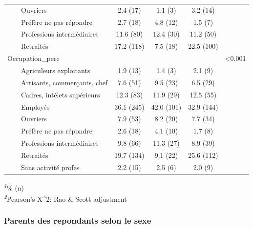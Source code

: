 \documentclass[
]{article}
\begin{document}
\begin{table}[!t]
\begin{tabular*}{\linewidth}{@{\extracolsep{\fill}}lcccc}
    Ouvriers & 2.4 (17) & 1.1 (3) & 3.2 (14) &  \\ 
    Préfère ne pas répondre & 2.7 (18) & 4.8 (12) & 1.5 (7) &  \\ 
    Professions intermédiaires & 11.6 (80) & 12.4 (30) & 11.2 (50) &  \\ 
    Retraités & 17.2 (118) & 7.5 (18) & 22.5 (100) &  \\ 
Occupation\_pere &  &  &  & <0.001 \\ 
    Agriculeurs exploitants & 1.9 (13) & 1.4 (3) & 2.1 (9) &  \\ 
    Artisants, commerçants, chef & 7.6 (51) & 9.5 (23) & 6.5 (29) &  \\ 
    Cadres, intélets supérieurs & 12.3 (83) & 11.9 (29) & 12.5 (55) &  \\ 
    Employés & 36.1 (245) & 42.0 (101) & 32.9 (144) &  \\ 
    Ouvriers & 7.9 (53) & 8.2 (20) & 7.7 (34) &  \\ 
    Préfère ne pas répondre & 2.6 (18) & 4.1 (10) & 1.7 (8) &  \\ 
    Professions intermédiaires & 9.8 (66) & 11.3 (27) & 8.9 (39) &  \\ 
    Retraités & 19.7 (134) & 9.1 (22) & 25.6 (112) &  \\ 
    Sans activité profes & 2.2 (15) & 2.5 (6) & 2.0 (9) &  \\ 
\bottomrule
\end{tabular*}
\begin{minipage}{\linewidth}
\textsuperscript{\textit{1}}\% (n)\\
\textsuperscript{\textit{2}}Pearson's X\^{}2: Rao \& Scott adjustment\\
\end{minipage}
\end{table}
\vspace{1cm}

\hypertarget{parents-des-repondants-selon-le-sexe}{%
\subsubsection{Parents des repondants selon le
sexe}\label{parents-des-repondants-selon-le-sexe}}
\end{document}
